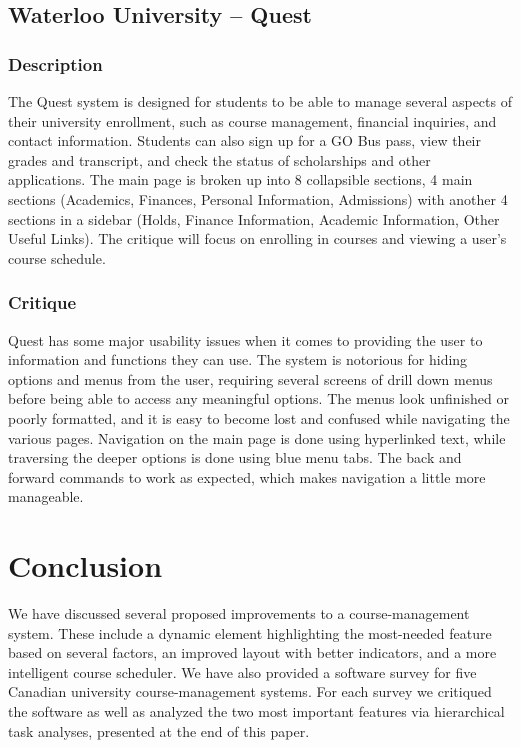 \documentclass[10pt]{article}
\begin{document}
\begin{multicols}{2}
\subsection*{Waterloo University -- Quest}
\subsubsection*{Description}
The Quest system is designed for students to be able to manage several aspects of their university enrollment, such as course management, financial inquiries, and contact information. Students can also sign up for a GO Bus pass, view their grades and transcript, and check the status of scholarships and other applications. The main page is broken up into 8 collapsible sections, 4 main sections (Academics, Finances, Personal Information, Admissions) with another 4 sections in a sidebar (Holds, Finance Information, Academic Information, Other Useful Links). The critique will focus on enrolling in courses and viewing a user’s course schedule. 

\subsubsection*{Critique}
Quest has some major usability issues when it comes to providing the user to information and functions they can use. The system is notorious for hiding options and menus from the user, requiring several screens of drill down menus before being able to access any meaningful options. The menus look unfinished or poorly formatted, and it is easy to become lost and confused while navigating the various pages. Navigation on the main page is done using hyperlinked text, while traversing the deeper options is done using blue menu tabs. The back and forward commands to work as expected, which makes navigation a little more manageable. 

\section*{Conclusion}
We have discussed several proposed improvements to a course-management system. These include a dynamic element highlighting the most-needed feature based on several factors, an improved layout with better indicators, and a more intelligent course scheduler. We have also provided a software survey for five Canadian university course-management systems. For each survey we critiqued the software as well as analyzed the two most important features via hierarchical task analyses, presented at the end of this paper.

\end{multicols}
\end{document}
